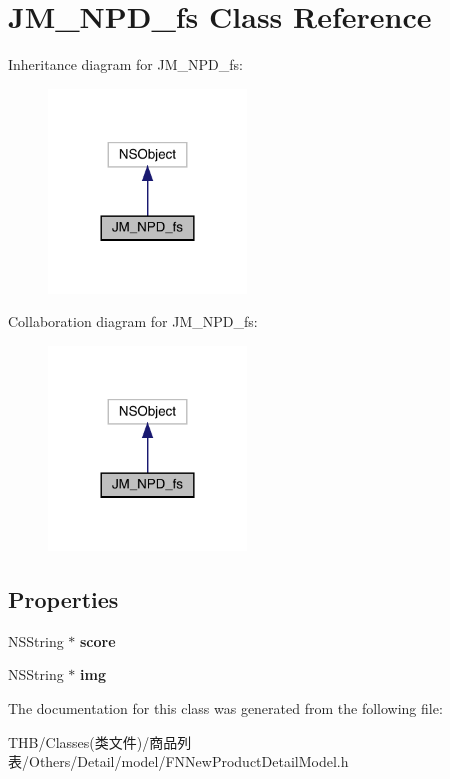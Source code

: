 \hypertarget{interface_j_m___n_p_d__fs}{}\section{J\+M\+\_\+\+N\+P\+D\+\_\+fs Class Reference}
\label{interface_j_m___n_p_d__fs}


Inheritance diagram for J\+M\+\_\+\+N\+P\+D\+\_\+fs\+:\nopagebreak
\begin{figure}[H]
\begin{center}
\leavevmode
\includegraphics[width=149pt]{interface_j_m___n_p_d__fs__inherit__graph}
\end{center}
\end{figure}


Collaboration diagram for J\+M\+\_\+\+N\+P\+D\+\_\+fs\+:\nopagebreak
\begin{figure}[H]
\begin{center}
\leavevmode
\includegraphics[width=149pt]{interface_j_m___n_p_d__fs__coll__graph}
\end{center}
\end{figure}
\subsection*{Properties}
\begin{DoxyCompactItemize}
\item 
\mbox{\label{interface_j_m___n_p_d__fs_a6a3b8bdefc2513be547a2487177f8e19}} 
N\+S\+String $\ast$ {\bfseries score}
\item 
\mbox{\label{interface_j_m___n_p_d__fs_ad2b1e9071078c5566693950cf98ee486}} 
N\+S\+String $\ast$ {\bfseries img}
\end{DoxyCompactItemize}


The documentation for this class was generated from the following file\+:\begin{DoxyCompactItemize}
\item 
T\+H\+B/\+Classes(类文件)/商品列表/\+Others/\+Detail/model/F\+N\+New\+Product\+Detail\+Model.\+h\end{DoxyCompactItemize}
